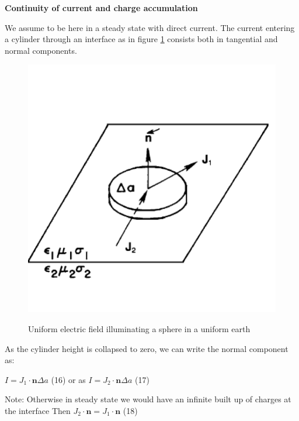 \documentclass[11pt,letterpaper,leqno]{amsart}
\numberwithin{equation}{section}
\begin{document}
\vspace{0.4cm}


\Large
\textbf{Continuity of current and charge accumulation}

\vspace{0.4cm}

We assume to be here in a steady state with direct current.
The current entering a cylinder through an interface as in figure \ref{Normal J continuous} consists both in tangential and normal components. 

\begin{figure}[h]
\caption{Uniform electric field illuminating a sphere in a uniform earth}
\includegraphics[scale=0.2]{Jcontinuous.png}
\label{Normal J continuous}
\end{figure}

As the cylinder height is collapsed to zero, we can write the normal component as:

$I=J_1 \cdot \mathbf{n} \Delta a$ \quad (16)
or as
$I=J_2 \cdot \mathbf{n} \Delta a$ \quad (17)
\vspace{0.4cm}

Note: Otherwise in steady state we would have an infinite built up of charges at the interface 
\vspace{0.4cm}
Then $J_2 \cdot \mathbf{n} = J_1 \cdot \mathbf{n}$ \quad (18)
\vspace{0.4cm}
\end{document}
